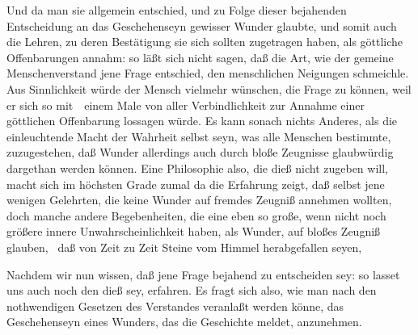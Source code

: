 \begin{aufza}
\begin{aufzb}
\item  Und da man sie allgemein  entschied, und zu Folge dieser bejahenden Entscheidung an das Geschehenseyn gewisser Wunder glaubte, und somit auch die Lehren, zu deren Bestätigung sie sich sollten zugetragen haben, als göttliche Offenbarungen annahm: so läßt sich nicht sagen, daß die Art, wie der gemeine Menschenverstand jene Frage entschied, den menschlichen Neigungen schmeichle. Aus Sinnlichkeit würde der Mensch vielmehr wünschen, die Frage  zu können, weil er sich so mit~\ einem Male von aller Verbindlichkeit zur Annahme einer göttlichen Offenbarung lossagen würde. Es kann sonach nichts Anderes, als die einleuchtende Macht der Wahrheit selbst seyn, was alle Menschen bestimmte, zuzugestehen, daß Wunder allerdings auch durch bloße Zeugnisse glaubwürdig dargethan werden können. Eine Philosophie also, die dieß nicht zugeben will, macht sich im höchsten Grade  zumal da die Erfahrung zeigt, daß selbst jene wenigen Gelehrten, die keine Wunder auf fremdes Zeugniß annehmen wollten, doch manche andere Begebenheiten, die eine eben so große, wenn nicht noch größere innere Unwahrscheinlichkeit haben, als Wunder, auf bloßes Zeugniß glauben, \zB\ daß von Zeit zu Zeit Steine vom Himmel herabgefallen seyen, \udgl\  
\end{aufzb}
\item  Nachdem wir nun wissen, daß jene Frage bejahend zu entscheiden sey: so lasset uns auch noch den  dieß sey, erfahren. Es fragt sich also, wie man nach den nothwendigen Gesetzen des Verstandes veranlaßt werden könne, das Geschehenseyn eines Wunders, das die Geschichte meldet, anzunehmen.
\begin{aufzb}

\end{aufzb}
\end{aufza}
